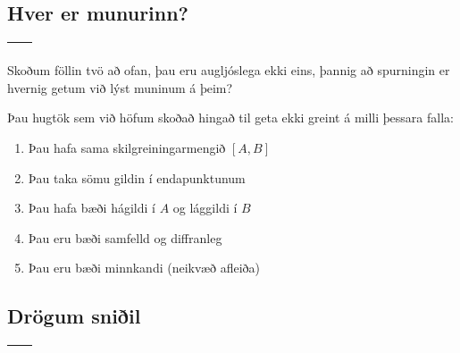 \documentclass[b5paper,11pt,icelandic]{sphinxmanual}
\begin{document}
\subsection{Hver er munurinn?}
\label{kafli05:hver-er-munurinn}
\noindent\begin{tabulary}{\linewidth}{|L|L|}
\hline
{}\label{kafli05:figa}
&\label{kafli05:figb}
\\
\hline\end{tabulary}


Skoðum föllin tvö að ofan, þau eru augljóslega ekki eins, þannig að
spurningin er hvernig getum við lýst muninum á þeim?

Þau hugtök sem við höfum skoðað hingað til geta ekki greint á milli
þessara falla:
\begin{enumerate}
\item {} 
Þau hafa sama skilgreiningarmengið \([A,B]\)

\item {} 
Þau taka sömu gildin í endapunktunum

\item {} 
Þau hafa bæði hágildi í \(A\) og lággildi í \(B\)

\item {} 
Þau eru bæði samfelld og diffranleg

\item {} 
Þau eru bæði minnkandi (neikvæð afleiða)

\end{enumerate}


\subsection{Drögum sniðil}
\label{kafli05:drogum-sniil}
\noindent\begin{tabulary}{\linewidth}{|L|L|}
\hline
{}\label{kafli05:figa2}
&\label{kafli05:figb2}
\\
\hline\end{tabulary}
\end{document}

